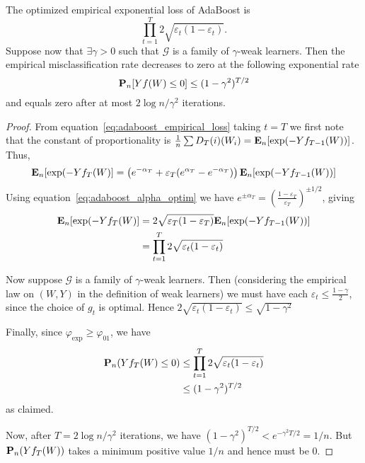 \begin{theorem}
The optimized empirical exponential loss of AdaBoost is
\begin{equation*}
	\prod_{t=1}^T 2 \sqrt{\varepsilon_t (1 - \varepsilon_t)}.
\end{equation*}
Suppose now that $\exists \gamma > 0$ such that $\mathcal{G}$ is a family of $\gamma$-weak learners. Then the empirical misclassification rate decreases to zero at the following exponential rate
\begin{equation*}
	\mathbf{P}_n [Yf(W) \le 0] \le (1 - \gamma^2)^{T/2}
\end{equation*}
and equals zero after at most $2\log n/\gamma^2$ iterations.

\begin{proof}
From equation~\eqref{eq:adaboost_empirical_loss} taking $t=T$ we first note that the constant of proportionality is $\frac{1}{n}\sum D_T(i)(W_i) = \mathbf{E}_n [\exp(-Yf_{T-1}(W))]$. Thus,
\begin{equation*}
	\E_n[\exp(-Yf_T(W)] = \left( e^{-\alpha_T} + \varepsilon_T(e^{\alpha_T} - e^{-\alpha_T}) \right) \E_n [\exp(-Yf_{T-1}(W))] \\
\end{equation*}
Using equation~\eqref{eq:adaboost_alpha_optim} we have $e^{\pm \alpha_T} = \left(\frac{1 - \varepsilon_T}{\varepsilon_T}\right)^{\pm 1/2}$, giving
\begin{align*}
	\E_n[\exp(-Yf_T(W)] &= 2\sqrt{\varepsilon_T (1-\varepsilon_T)} \E_n [\exp(-Yf_{T-1}(W))] \\
	&= \prod_{t=1}^T 2\sqrt{\varepsilon_t (1-\varepsilon_t)}
\end{align*}

Now suppose $\mathcal{G}$ is a family of $\gamma$-weak learners. Then (considering the empirical law on $(W, Y)$ in the definition of weak learners) we must have each $\varepsilon_t \le \frac{1 - \gamma}{2}$, since the choice of $g_t$ is optimal. Hence $2\sqrt{\varepsilon_t(1 - \varepsilon_t)} \le \sqrt{1 - \gamma^2}$

Finally, since $\varphi_\text{exp} \ge \varphi_{01}$, we have
\begin{align*}
	\Prob_n(Yf_T(W) \le 0) &\le \prod_{t=1}^T 2\sqrt{\varepsilon_t (1-\varepsilon_t)} \\
	&\le (1 - \gamma^2)^{T/2}
\end{align*}
as claimed.

Now, after $T = 2\log n/\gamma^2$ iterations, we have $(1 - \gamma^2)^{T/2} < e^{-\gamma^2 T/2} = 1/n$. But $\mathbf{P} _n(Yf_T(W))$ takes a minimum positive value $1/n$ and hence must be $0$.

\end{proof}
\end{theorem}


